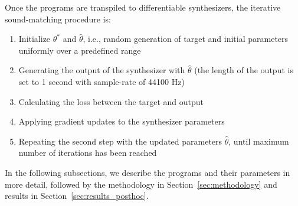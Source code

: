 \documentclass[lettersize,journal]{IEEEtran}
\newcommand{\BPNoise}{\textbf{BP-Noise}}
\newcommand{\AddSineSaw}{\textbf{Add-SineSaw}}
\newcommand{\AmpMod}{\textbf{Noise-AM}}
\newcommand{\FMMod}{\textbf{SineSaw-AM}}
\begin{document}
 Once the programs are transpiled to differentiable synthesizers, the iterative sound-matching procedure is:
 \begin{enumerate}
    \item Initialize $\theta^*$ and $\hat{\theta}$, i.e., random generation of target and initial parameters uniformly over a predefined range
    \item Generating the output of the synthesizer with $\hat{\theta}$ (the length of the output is set to 1 second with sample-rate of 44100 Hz) 
    \item Calculating the loss between the target and output
    \item Applying gradient updates to the synthesizer parameters
    \item Repeating the second step with the updated parameters $\hat{\theta}$, until maximum number of iterations has been reached
 \end{enumerate}


In the following subsections, we describe the programs and their parameters in more detail, followed by the methodology in Section~\ref{sec:methodology} and results in Section~\ref{sec:results_posthoc}.

\end{document}
